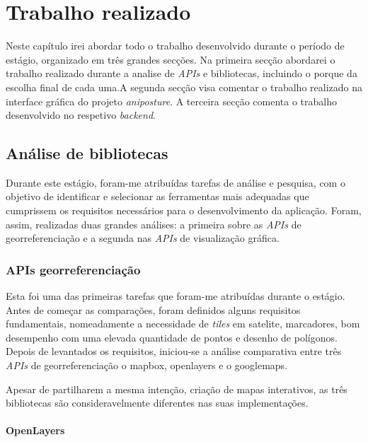 \chapter{Trabalho realizado}
\label{chapter:work-done}

\begin{introduction}
    Neste capítulo irei abordar todo o trabalho desenvolvido durante o período de estágio, organizado em três grandes secções. Na primeira secção abordarei o trabalho realizado durante a analise de \textit{APIs} e bibliotecas, incluindo o porque da escolha final de cada uma.A segunda secção visa comentar o trabalho realizado na interface gráfica do projeto \textit{aniposture}. A terceira secção comenta o trabalho desenvolvido no respetivo \textit{backend}.
\end{introduction}

\section{Análise de bibliotecas}\label{sec:analysis}
Durante este estágio, foram-me atribuídas tarefas de análise e pesquisa, com o objetivo de identificar e selecionar as ferramentas mais adequadas que cumprissem os requisitos necessários para o desenvolvimento da aplicação. Foram, assim, realizadas duas grandes análises: a primeira sobre as \textit{APIs} de georreferenciação e a segunda nas \textit{APIs} de visualização gráfica.

\subsection{APIs georreferenciação}
Esta foi uma das primeiras tarefas que foram-me atribuídas durante o estágio. Antes de começar as comparações, foram definidos alguns requisitos fundamentais, nomeadamente a necessidade de \textit{tiles} em satelite, marcadores, bom desempenho com uma elevada quantidade de pontos e desenho de polígonos. Depois de levantados os requisitos, iniciou-se a análise comparativa entre três \textit{APIs} de georreferenciação o mapbox, openlayers e o googlemaps.

Apesar de partilharem a mesma intenção, criação de mapas interativos, as três bibliotecas são consideravelmente diferentes nas suas implementações. 

\subsubsection{\textbf{OpenLayers}}\label{sec:sub_ol}

